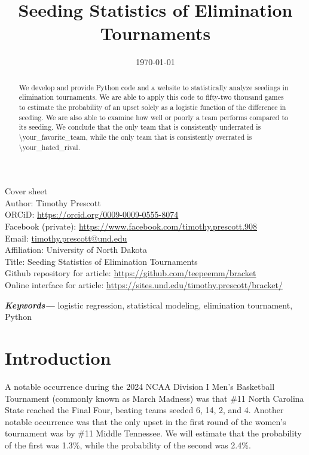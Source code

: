 \documentclass{article}
\title{Seeding Statistics of Elimination Tournaments}
\author{\authorinfo}
\date{\today}
\begin{document}
\noindent
Cover sheet\\
Author: Timothy Prescott\\
ORCiD: \url{https://orcid.org/0009-0009-0555-8074}\\
Facebook (private): \url{https://www.facebook.com/timothy.prescott.908}\\
Email: \url{timothy.prescott@und.edu}\\
Affiliation: University of North Dakota\\
Title: Seeding Statistics of Elimination Tournaments\\
Github repository for article: \url{https://github.com/teepeemm/bracket}\\
Online interface for article: \url{https://sites.und.edu/timothy.prescott/bracket/}

\clearpage

\maketitle

\tableofcontents

\begin{abstract}\noindent
We develop and provide Python code and a website to statistically analyze seedings in elimination tournaments.  We are able to apply this code to fifty-two thousand games to estimate the probability of an upset solely as a logistic function of the difference in seeding.  We are also able to examine how well or poorly a team performs compared to its seeding.  We conclude that the only team that is consistently underrated is \textbackslash your\_favorite\_team, while the only team that is consistently overrated is \textbackslash your\_hated\_rival.
\end{abstract}

\noindent
{\small\textbf{\textit{Keywords---}} logistic regression, statistical modeling, elimination tournament, Python}

\section{Introduction}
A notable occurrence during the 2024 NCAA Division I Men's Basketball Tournament (commonly known as March Madness) was that \#11 North Carolina State reached the Final Four, beating teams seeded 6, 14, 2, and 4.  Another notable occurrence was that the only upset in the first round of the women's tournament was by \#11 Middle Tennessee.  We will estimate that the probability of the first was 1.3\%, while the probability of the second was 2.4\%.
\end{document}

